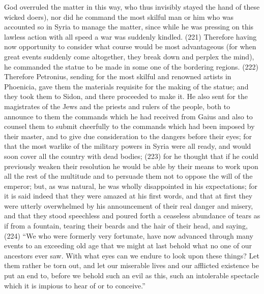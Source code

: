 God overruled the matter in this way, who thus invisibly stayed the hand of these wicked doers),
nor did he command the most skilful man or him who was accounted so in Syria to manage the
matter, since while he was pressing on this lawless action with all speed a war was suddenly
kindled. (221) Therefore having now opportunity to consider what course would be most
advantageous (for when great events suddenly come altogether, they break down and perplex the
mind), he commanded the statue to be made in some one of the bordering regions. (222)
Therefore Petronius, sending for the most skilful and renowned artists in Phoenicia, gave them the
materials requisite for the making of the statue; and they took them to Sidon, and there proceeded
to make it. He also sent for the magistrates of the Jews and the priests and rulers of the people,
both to announce to them the commands which he had received from Gaius and also to counsel
them to submit cheerfully to the commands which had been imposed by their master, and to give
due consideration to the dangers before their eyes; for that the most warlike of the military powers
in Syria were all ready, and would soon cover all the country with dead bodies; (223) for he thought
that if he could previously weaken their resolution he would be able by their means to work upon all
the rest of the multitude and to persuade them not to oppose the will of the emperor; but, as was
natural, he was wholly disappointed in his expectations; for it is said indeed that they were amazed
at his first words, and that at first they were utterly overwhelmed by his announcement of their real
danger and misery, and that they stood speechless and poured forth a ceaseless abundance of
tears as if from a fountain, tearing their beards and the hair of their head, and saying, (224) ``We
who were formerly very fortunate, have now advanced through many events to an exceeding old
age that we might at last behold what no one of our ancestors ever saw. With what eyes can we
endure to look upon these things? Let them rather be torn out, and let our miserable lives and our
afflicted existence be put an end to, before we behold such an evil as this, such an intolerable
spectacle which it is impious to hear of or to conceive.''

